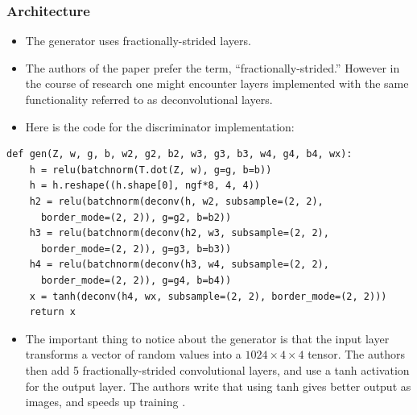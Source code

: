\documentclass{beamer}
\begin{document}
\begin{frame}[fragile]
\frametitle{Architecture}
\begin{itemize}
 \item The generator uses fractionally-strided layers.
 \item The authors of the paper prefer the term, ``fractionally-strided.'' However
  in the course of research one might encounter layers implemented with the same
  functionality referred to as deconvolutional layers.
\item Here is the code for the discriminator implementation:
\end{itemize}
\begin{tiny} 
\begin{lstlisting}
def gen(Z, w, g, b, w2, g2, b2, w3, g3, b3, w4, g4, b4, wx):
    h = relu(batchnorm(T.dot(Z, w), g=g, b=b))
    h = h.reshape((h.shape[0], ngf*8, 4, 4))
    h2 = relu(batchnorm(deconv(h, w2, subsample=(2, 2), 
      border_mode=(2, 2)), g=g2, b=b2))
    h3 = relu(batchnorm(deconv(h2, w3, subsample=(2, 2), 
      border_mode=(2, 2)), g=g3, b=b3))
    h4 = relu(batchnorm(deconv(h3, w4, subsample=(2, 2), 
      border_mode=(2, 2)), g=g4, b=b4))
    x = tanh(deconv(h4, wx, subsample=(2, 2), border_mode=(2, 2)))
    return x
\end{lstlisting}
\end{tiny}
\begin{footnotesize}
\begin{itemize}
\item The important thing to notice about the generator is that the input
  layer transforms a vector of random values into a $1024  \times 4 \times 4$
  tensor.  The authors then add 5 fractionally-strided convolutional layers, and
  use a tanh activation for the output layer. The authors write that using tanh
  gives better output as images, and speeds up training \cite{repLearnDcgan}. 
\end{itemize}
\end{footnotesize}
\end{frame}

\end{document}
